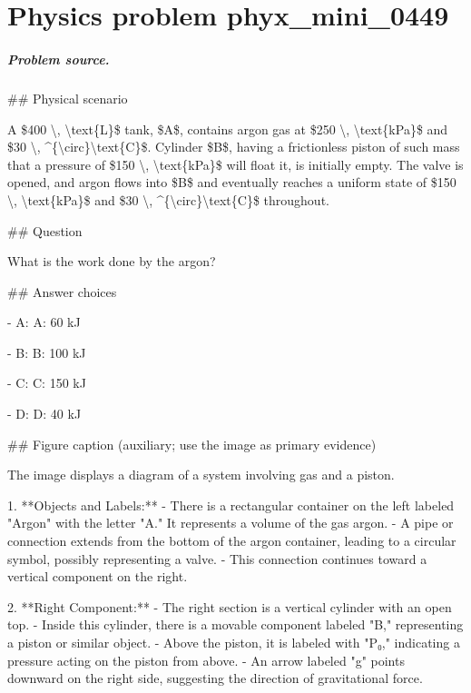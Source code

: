 
\chapter{Physics problem phyx\_mini\_0449}
\label{ch:PhyXMiniProblems_problem_phyx_mini_0449}

\paragraph{Problem source.}
\#\# Physical scenario

A \$400 \textbackslash{}, \textbackslash{}text\{L\}\$ tank, \$A\$, contains argon gas at \$250 \textbackslash{}, \textbackslash{}text\{kPa\}\$ and \$30 \textbackslash{}, \textasciicircum{}\{\textbackslash{}circ\}\textbackslash{}text\{C\}\$. Cylinder \$B\$, having a frictionless piston of such mass that a pressure of \$150 \textbackslash{}, \textbackslash{}text\{kPa\}\$ will float it, is initially empty. The valve is opened, and argon flows into \$B\$ and eventually reaches a uniform state of \$150 \textbackslash{}, \textbackslash{}text\{kPa\}\$ and \$30 \textbackslash{}, \textasciicircum{}\{\textbackslash{}circ\}\textbackslash{}text\{C\}\$ throughout.

\#\# Question

What is the work done by the argon?

\#\# Answer choices

- A: A: 60 kJ

- B: B: 100 kJ

- C: C: 150 kJ

- D: D: 40 kJ

\#\# Figure caption (auxiliary; use the image as primary evidence)

The image displays a diagram of a system involving gas and a piston. 

1. **Objects and Labels:**
   - There is a rectangular container on the left labeled "Argon" with the letter "A." It represents a volume of the gas argon.
   - A pipe or connection extends from the bottom of the argon container, leading to a circular symbol, possibly representing a valve.
   - This connection continues toward a vertical component on the right.

2. **Right Component:**
   - The right section is a vertical cylinder with an open top.
   - Inside this cylinder, there is a movable component labeled "B," representing a piston or similar object.
   - Above the piston, it is labeled with "P₀," indicating a pressure acting on the piston from above.
   - An arrow labeled "g" points downward on the right side, suggesting the direction of gravitational force.


